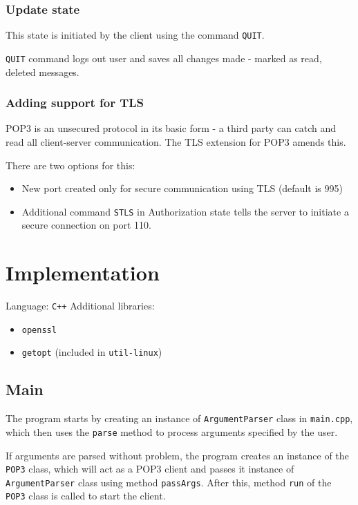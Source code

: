 \documentclass{article}
\begin{document}
\subsubsection{Update state}
\par
This state is initiated by the client using the command \verb|QUIT|.
\par


\verb|QUIT| command logs out user and saves all changes made - marked as read, deleted messages.
\subsubsection{Adding support for TLS}
\par
POP3 is an unsecured protocol in its basic form - a third party can catch and read all client-server communication.
The TLS extension for POP3 amends this.


\par
There are two options for this:
\begin{itemize}
    \item New port created only for secure communication using TLS (default is 995)
    \item Additional command \verb|STLS| in Authorization state tells the server to initiate a secure connection on port 110.
\end{itemize}

\newpage

\section{Implementation}
\par
Language: \verb|C++|
\newline
Additional libraries:
\begin{itemize}
    \item \verb|openssl|
    \item \verb|getopt| (included in \verb|util-linux|)
\end{itemize}


\subsection{Main}
\par
The program starts by creating an instance of \verb|ArgumentParser| class in \verb|main.cpp|, which then uses the \verb|parse| method to process arguments specified by the user. 
\par
If arguments are parsed without problem, the program creates an instance of the \verb|POP3| class, which will act as a POP3 client and passes it instance of \verb|ArgumentParser| class using method \verb|passArgs|.
After this, method \verb|run| of the \verb|POP3| class is called to start the client.
\end{document}

